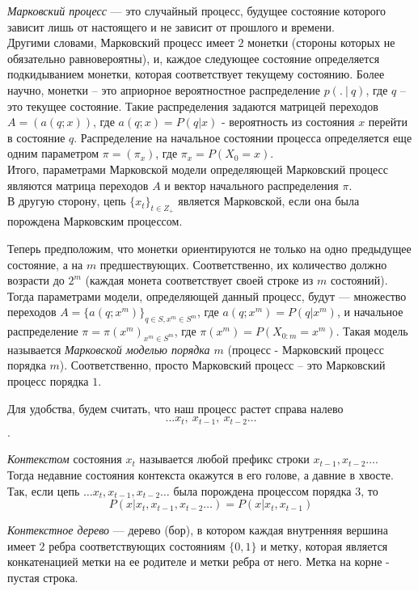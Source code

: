 \documentclass{matmex-diploma-custom}
\begin{document}
\textit{Марковский процесс} --- это случайный процесс, будущее состояние которого зависит лишь от настоящего и не зависит от прошлого и времени.
\\
Другими словами, Марковский процесс имеет $ 2 $ монетки (стороны которых не обязательно равновероятны), и, каждое следующее состояние определяется подкидыванием монетки, которая соответствует текущему состоянию.
Более научно, монетки -- это априорное вероятностное распределение $p(.~|~q)$, где $ q $ -- это текущее состояние.
Такие распределения задаются матрицей переходов $A = (a(q;x))$, где $a(q; x) = P(q|x)$ - вероятность из состояния $ x $ перейти в состояние $ q $.
Распределение на начальное состоянии процесса определяется еще одним параметром $ \pi = (\pi_{x})$, где $ \pi_{x}=P(X_{0}=x)$.
\\
Итого, параметрами Марковской модели определяющей Марковский процесс являются
матрица переходов $ A $ и вектор начального распределения $\pi$.
\\
В другую сторону,
цепь $ \{x_{t}\}_{t \in Z_{+}} $ является Марковской, если она была порождена Марковским процессом.

Теперь предположим, что монетки ориентируются не только на одно предыдущее состояние, а на $ m $ предшествующих. 
Соответственно, их количество должно возрасти до $2^{m}$ (каждая монета соответствует своей строке из $ m $ состояний).
Тогда параметрами модели, определяющей данный процесс, будут --- множество переходов $ A = \{a(q; x^{m})\}_{q \in S, x^{m} \in S^{m}}$, где $a(q; x^{m}) = P(q|x^{m})$, и начальное распределение $ \pi = \pi(x^m)_{x^m \in S^m}$, где $\pi(x^m) = P(X_{0:m}=x^m)$.
Такая модель называется \textit{Марковской моделью порядка $ m $} (процесс - Марковский процесс порядка $ m $).
Соответственно, просто Марковский процесс -- это Марковский процесс порядка $ 1 $.

Для удобства, будем считать, что наш процесс растет справа налево  
$$\ldots x_{t},~ x_{t-1},~ x_{t-2} \ldots$$.

\textit{Контекстом} состояния $ x_{t} $  называется любой префикс строки  $x_{t-1}, x_{t-2} \ldots$. 
\\
Тогда недавние состояния контекста окажутся в его голове, а давние в хвосте.
\\
Так,  если цепь $\ldots x_{t}, x_{t-1}, x_{t-2} \ldots$ была порождена процессом порядка $3$,
то $$P(x|x_{t},x_{t-1},x_{t-2}\ldots) = P(x|x_{t},x_{t-1})$$

\textit{Контекстное дерево} --- дерево (бор), в котором каждая внутренняя вершина имеет $ 2 $ ребра соответствующих состояниям $\{0,1\}$ и метку, которая является конкатенацией метки на ее родителе и метки ребра от него. Метка на корне - пустая строка. 
\end{document}
